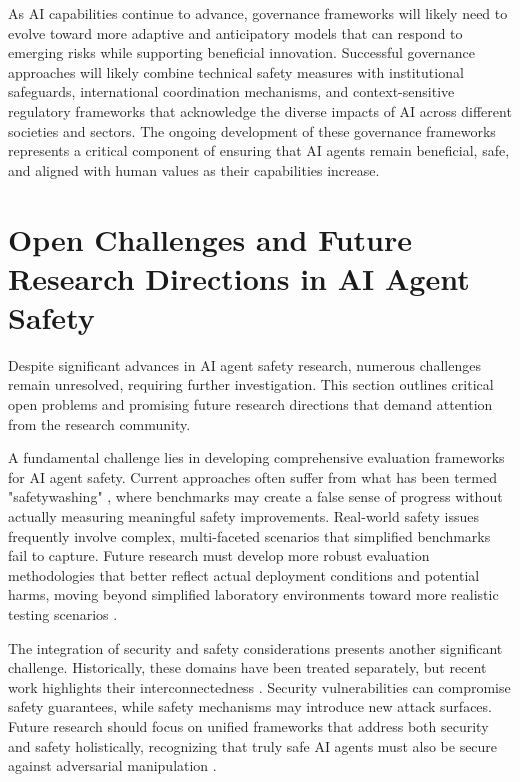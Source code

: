\documentclass[conference]{IEEEtran}
\begin{document}
As AI capabilities continue to advance, governance frameworks will likely need to evolve toward more adaptive and anticipatory models that can respond to emerging risks while supporting beneficial innovation. Successful governance approaches will likely combine technical safety measures with institutional safeguards, international coordination mechanisms, and context-sensitive regulatory frameworks that acknowledge the diverse impacts of AI across different societies and sectors. The ongoing development of these governance frameworks represents a critical component of ensuring that AI agents remain beneficial, safe, and aligned with human values as their capabilities increase.



\section{Open Challenges and Future Research Directions in AI Agent Safety}

Despite significant advances in AI agent safety research, numerous challenges remain unresolved, requiring further investigation. This section outlines critical open problems and promising future research directions that demand attention from the research community.

A fundamental challenge lies in developing comprehensive evaluation frameworks for AI agent safety. Current approaches often suffer from what has been termed "safetywashing" \cite{2407.21792}, where benchmarks may create a false sense of progress without actually measuring meaningful safety improvements. Real-world safety issues frequently involve complex, multi-faceted scenarios that simplified benchmarks fail to capture. Future research must develop more robust evaluation methodologies that better reflect actual deployment conditions and potential harms, moving beyond simplified laboratory environments toward more realistic testing scenarios \cite{2408.12935}.

The integration of security and safety considerations presents another significant challenge. Historically, these domains have been treated separately, but recent work highlights their interconnectedness \cite{2405.19524}. Security vulnerabilities can compromise safety guarantees, while safety mechanisms may introduce new attack surfaces. Future research should focus on unified frameworks that address both security and safety holistically, recognizing that truly safe AI agents must also be secure against adversarial manipulation \cite{2406.08689}.
\end{document}
